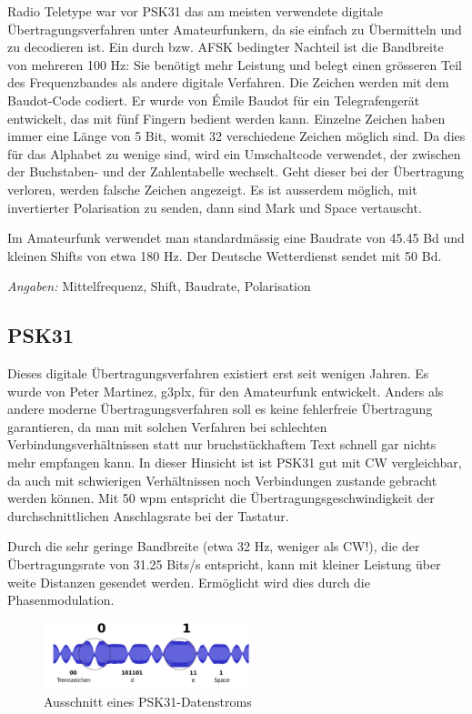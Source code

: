 Radio Teletype war vor PSK31 das am meisten verwendete digitale Übertragungsverfahren unter Amateurfunkern, da sie einfach zu Übermitteln und zu decodieren ist. Ein durch  bzw. AFSK bedingter Nachteil ist die Bandbreite von mehreren 100 Hz: Sie benötigt mehr Leistung und belegt einen grösseren Teil des Frequenzbandes als andere digitale Verfahren. Die Zeichen werden mit dem Baudot-Code codiert. Er wurde von Émile Baudot für ein Telegrafengerät entwickelt, das mit fünf Fingern bedient werden kann. Einzelne Zeichen haben immer eine Länge von 5 Bit, womit 32 verschiedene Zeichen möglich sind. Da dies für das Alphabet zu wenige sind, wird ein Umschaltcode verwendet, der zwischen der Buchstaben- und der Zahlentabelle wechselt. Geht dieser bei der Übertragung verloren, werden falsche Zeichen angezeigt. Es ist ausserdem möglich, mit invertierter Polarisation zu senden, dann sind Mark und Space vertauscht.

Im Amateurfunk verwendet man standardmässig eine Baudrate von 45.45 Bd und kleinen Shifts von etwa 180 Hz. Der Deutsche Wetterdienst sendet mit 50 Bd.

\textit{Angaben:} Mittelfrequenz, Shift, Baudrate, Polarisation

\subsection{PSK31}
Dieses digitale Übertragungsverfahren existiert erst seit wenigen Jahren. Es wurde von Peter Martinez, g3plx, für den Amateurfunk entwickelt. Anders als andere moderne Übertragungsverfahren soll es keine fehlerfreie Übertragung garantieren, da man mit solchen Verfahren bei schlechten Verbindungsverhältnissen statt nur bruchstückhaftem Text schnell gar nichts mehr empfangen kann. In dieser Hinsicht ist ist PSK31 gut mit CW vergleichbar, da auch mit schwierigen Verhältnissen noch Verbindungen zustande gebracht werden können. Mit 50 wpm entspricht die Übertragungsgeschwindigkeit der durchschnittlichen Anschlagsrate bei der Tastatur.

Durch die sehr geringe Bandbreite (etwa 32 Hz, weniger als CW!), die der Übertragungsrate von 31.25 Bits/s entspricht, kann mit kleiner Leistung über weite Distanzen gesendet werden. Ermöglicht wird dies durch die Phasenmodulation.

\begin{figure}[h!]
 \centering
 \includegraphics[width=6cm]{./png/Amfu-PSK31-0101.png}
 \caption{Ausschnitt eines PSK31-Datenstroms}
 \label{fig:psk31}
\end{figure}


